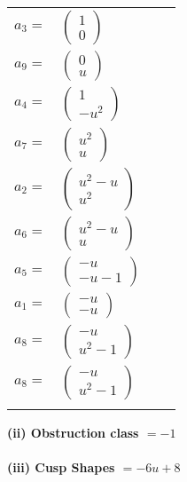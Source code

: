 \documentclass[1p]{elsarticle_modified}
\theoremstyle{definition}
\begin{document}
\begin{tabular}{m{7pt} m{180pt} m{7pt} m{180pt} }
\flushright $a_{3}=$&$\begin{pmatrix}1\\0\end{pmatrix}$ \\
\flushright $a_{9}=$&$\begin{pmatrix}0\\u\end{pmatrix}$ \\
\flushright $a_{4}=$&$\begin{pmatrix}1\\- u^2\end{pmatrix}$ \\
\flushright $a_{7}=$&$\begin{pmatrix}u^2\\u\end{pmatrix}$ \\
\flushright $a_{2}=$&$\begin{pmatrix}u^2- u\\u^2\end{pmatrix}$ \\
\flushright $a_{6}=$&$\begin{pmatrix}u^2- u\\u\end{pmatrix}$ \\
\flushright $a_{5}=$&$\begin{pmatrix}- u\\- u-1\end{pmatrix}$ \\
\flushright $a_{1}=$&$\begin{pmatrix}- u\\- u\end{pmatrix}$ \\
\flushright $a_{8}=$&$\begin{pmatrix}- u\\u^2-1\end{pmatrix}$\\ \flushright $a_{8}=$&$\begin{pmatrix}- u\\u^2-1\end{pmatrix}$\\&\end{tabular}
\flushleft \textbf{(ii) Obstruction class $= -1$}\\~\\
\flushleft \textbf{(iii) Cusp Shapes $= -6 u+8$}\\~\\
\end{document}
